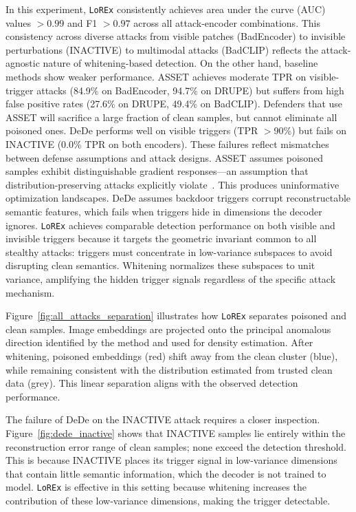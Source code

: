 \documentclass[letterpaper,twocolumn,10pt]{article}
\begin{document}
In this experiment, \texttt{LoREx} consistently achieves area under the curve (AUC) values $>0.99$ and F1 $>0.97$ across all attack-encoder combinations. This consistency across diverse attacks from visible patches (BadEncoder) to invisible perturbations (INACTIVE) to multimodal attacks (BadCLIP) reflects the attack-agnostic nature of whitening-based detection. 
On the other hand, baseline methods show weaker performance. ASSET achieves moderate TPR on visible-trigger attacks (84.9\% on BadEncoder, 94.7\% on DRUPE) but suffers from high false positive rates (27.6\% on DRUPE, 49.4\% on BadCLIP). Defenders that use ASSET will sacrifice a large fraction of clean samples, but cannot eliminate all poisoned ones. DeDe performs well on visible triggers (TPR $>$90\%) but fails on INACTIVE (0.0\% TPR on both encoders). These failures reflect mismatches between defense assumptions and attack designs. ASSET assumes poisoned samples exhibit distinguishable gradient responses---an assumption that distribution-preserving attacks explicitly violate~\cite{tao2024distribution, zhang2025invisible}. This produces uninformative optimization landscapes. DeDe assumes backdoor triggers corrupt reconstructable semantic features, which fails when triggers hide in dimensions the decoder ignores. \texttt{LoREx} achieves comparable detection performance on both visible and invisible triggers because it targets the geometric invariant common to all stealthy attacks: triggers must concentrate in low-variance subspaces to avoid disrupting clean semantics. Whitening normalizes these subspaces to unit variance, amplifying the hidden trigger signals regardless of the specific attack mechanism. 

Figure~\ref{fig:all_attacks_separation} illustrates how \texttt{LoREx} separates poisoned and clean samples. 
Image embeddings are projected onto the principal anomalous direction identified by the method and used for density estimation. 
After whitening, poisoned embeddings (red) shift away from the clean cluster (blue), while remaining consistent with the distribution estimated from trusted clean data (grey). 
This linear separation aligns with the observed detection performance.



The failure of DeDe on the INACTIVE attack requires a closer inspection. 
Figure~\ref{fig:dede_inactive} shows that INACTIVE samples lie entirely within the reconstruction error range of clean samples; none exceed the detection threshold. 
This is because INACTIVE places its trigger signal in low-variance dimensions that contain little semantic information, which the decoder is not trained to model. 
\texttt{LoREx} is effective in this setting because whitening increases the contribution of these low-variance dimensions, making the trigger detectable.
\end{document}
